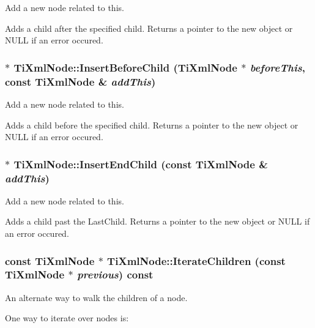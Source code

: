 Add a new node related to this. 

Adds a child after the specified child. Returns a pointer to the new object or NULL if an error occured.
\subsubsection{ $\ast$ Ti\-Xml\-Node::Insert\-Before\-Child ({\bf Ti\-Xml\-Node} $\ast$ {\em before\-This}, const {\bf Ti\-Xml\-Node} \& {\em add\-This})\hspace{0.3cm}{\tt  [inherited]}}\label{classTiXmlNode_TiXmlUnknowna34}


Add a new node related to this. 

Adds a child before the specified child. Returns a pointer to the new object or NULL if an error occured.
\subsubsection{ $\ast$ Ti\-Xml\-Node::Insert\-End\-Child (const {\bf Ti\-Xml\-Node} \& {\em add\-This})\hspace{0.3cm}{\tt  [inherited]}}\label{classTiXmlNode_TiXmlUnknowna32}


Add a new node related to this. 

Adds a child past the Last\-Child. Returns a pointer to the new object or NULL if an error occured.
\subsubsection{\setlength{\rightskip}{0pt plus 5cm}const {\bf Ti\-Xml\-Node} $\ast$ Ti\-Xml\-Node::Iterate\-Children (const {\bf Ti\-Xml\-Node} $\ast$ {\em previous}) const\hspace{0.3cm}{\tt  [inherited]}}\label{classTiXmlNode_TiXmlUnknowna26}


An alternate way to walk the children of a node. 

One way to iterate over nodes is: 

